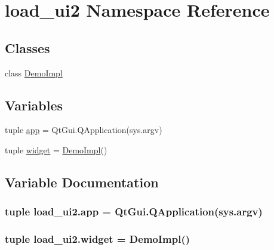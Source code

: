 \hypertarget{namespaceload__ui2}{}\section{load\+\_\+ui2 Namespace Reference}
\label{namespaceload__ui2}
\subsection*{Classes}
\begin{DoxyCompactItemize}
\item 
class \hyperlink{classload__ui2_1_1DemoImpl}{Demo\+Impl}
\end{DoxyCompactItemize}
\subsection*{Variables}
\begin{DoxyCompactItemize}
\item 
tuple \hyperlink{namespaceload__ui2_ae829e8e6bd4e1af83327b186167c7146}{app} = Qt\+Gui.\+Q\+Application(sys.\+argv)
\item 
tuple \hyperlink{namespaceload__ui2_a529de94ee44bfa3391188c407ce0f336}{widget} = \hyperlink{classload__ui2_1_1DemoImpl}{Demo\+Impl}()
\end{DoxyCompactItemize}


\subsection{Variable Documentation}
\hypertarget{namespaceload__ui2_ae829e8e6bd4e1af83327b186167c7146}{}
\subsubsection[{app}]{\setlength{\rightskip}{0pt plus 5cm}tuple load\+\_\+ui2.\+app = Qt\+Gui.\+Q\+Application(sys.\+argv)}\label{namespaceload__ui2_ae829e8e6bd4e1af83327b186167c7146}
\hypertarget{namespaceload__ui2_a529de94ee44bfa3391188c407ce0f336}{}
\subsubsection[{widget}]{\setlength{\rightskip}{0pt plus 5cm}tuple load\+\_\+ui2.\+widget = {\bf Demo\+Impl}()}\label{namespaceload__ui2_a529de94ee44bfa3391188c407ce0f336}
